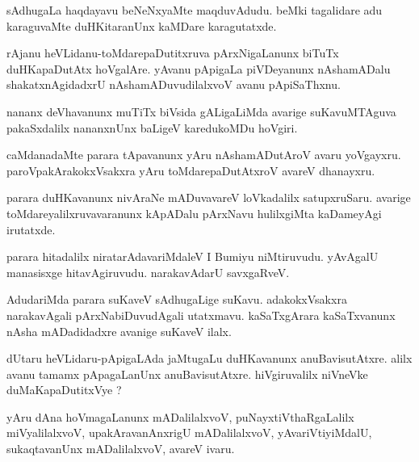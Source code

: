 \documentclass{article}
\begin{document}
\begin{mn}%
sAdhugaLa haqdayavu beNeNxyaMte maqduvAdudu. beMki tagalidare adu karaguvaMte 
duHKitaranUnx kaMDare karagutatxde.
\end{mn}

\begin{mn}%
rAjanu heVLidanu-toMdarepaDutitxruva pArxNigaLanunx biTuTx duHKapaDutAtx hoVgalAre. yAvanu 
pApigaLa piVDeyanunx nAshamADalu shakatxnAgidadxrU nAshamADuvudilalxvoV avanu pApiSaThxnu.
\end{mn}

\begin{mn}%
nananx deVhavanunx muTiTx biVsida gALigaLiMda avarige suKavuMTAguva pakaSxdalilx 
nananxnUnx baLigeV karedukoMDu hoVgiri.
\end{mn}

\begin{mn}%
caMdanadaMte parara tApavanunx yAru nAshamADutAroV  avaru yoVgayxru. 
paroVpakArakokxVsakxra yAru toMdarepaDutAtxroV avareV dhanayxru.
\end{mn}

\begin{mn}%
parara duHKavanunx nivAraNe mADuvavareV loVkadalilx satupxruSaru. avarige 
toMdareyalilxruvavaranunx kApADalu pArxNavu hulilxgiMta kaDameyAgi irutatxde.
\end{mn}

\begin{mn}%
parara hitadalilx niratarAdavariMdaleV I Bumiyu niMtiruvudu. yAvAgalU manasisxge 
hitavAgiruvudu. narakavAdarU savxgaRveV.
\end{mn}

\begin{mn}%
AdudariMda parara suKaveV sAdhugaLige suKavu. adakokxVsakxra narakavAgali 
pArxNabiDuvudAgali utatxmavu. kaSaTxgArara kaSaTxvanunx nAsha  mADadidadxre avanige 
suKaveV ilalx.
\end{mn}

\begin{mn}%
dUtaru heVLidaru-pApigaLAda jaMtugaLu duHKavanunx anuBavisutAtxre. alilx avanu tamamx 
pApagaLanUnx anuBavisutAtxre. hiVgiruvalilx niVneVke duMaKapaDutitxVye ?
\end{mn}

\begin{mn}%
yAru dAna hoVmagaLanunx mADalilalxvoV, puNayxtiVthaRgaLalilx miVyalilalxvoV, 
upakAravanAnxrigU mADalilalxvoV, yAvariVtiyiMdalU, sukaqtavanUnx mADalilalxvoV, avareV ivaru.
\end{mn}
\end{document}
